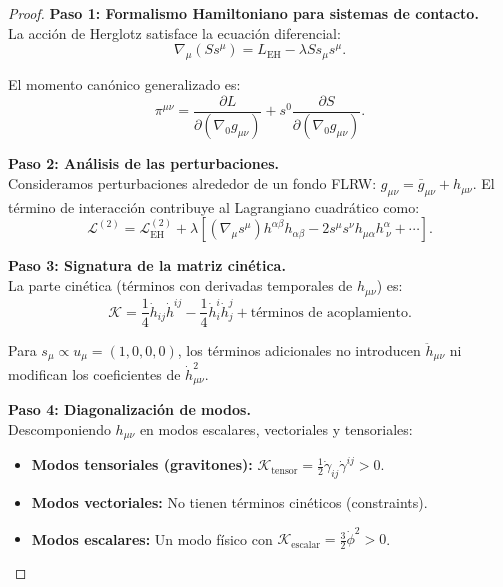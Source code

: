 \documentclass[11pt, a4paper]{article}
\theoremstyle{plain}
\theoremstyle{definition}
\begin{document}
\begin{proof}
\textbf{Paso 1: Formalismo Hamiltoniano para sistemas de contacto.} \\
La acción de Herglotz satisface la ecuación diferencial:
\begin{equation}
\nabla_\mu(S s^\mu) = L_{\text{EH}} - \lambda S s_\mu s^\mu.
\end{equation}

El momento canónico generalizado es:
\begin{equation}
\pi^{\mu\nu} = \frac{\partial L}{\partial (\nabla_0 g_{\mu\nu})} + s^0 \frac{\partial S}{\partial (\nabla_0 g_{\mu\nu})}.
\end{equation}

\textbf{Paso 2: Análisis de las perturbaciones.} \\
Consideramos perturbaciones alrededor de un fondo FLRW: $g_{\mu\nu} = \bar{g}_{\mu\nu} + h_{\mu\nu}$. El término de interacción contribuye al Lagrangiano cuadrático como:
\begin{equation}
\mathcal{L}^{(2)} = \mathcal{L}_{\text{EH}}^{(2)} + \lambda \left[(\nabla_\mu s^\mu) h^{\alpha\beta}h_{\alpha\beta} - 2 s^\mu s^\nu h_{\mu\alpha}h^\alpha_{\ \nu} + \cdots\right].
\end{equation}

\textbf{Paso 3: Signatura de la matriz cinética.} \\
La parte cinética (términos con derivadas temporales de $h_{\mu\nu}$) es:
\begin{equation}
\mathcal{K} = \frac{1}{4} \dot{h}_{ij}\dot{h}^{ij} - \frac{1}{4} \dot{h}^i_i \dot{h}^j_j + \text{términos de acoplamiento}.
\end{equation}

Para $s_\mu \propto u_\mu = (1,0,0,0)$, los términos adicionales no introducen $\ddot{h}_{\mu\nu}$ ni modifican los coeficientes de $\dot{h}_{\mu\nu}^2$.

\textbf{Paso 4: Diagonalización de modos.} \\
Descomponiendo $h_{\mu\nu}$ en modos escalares, vectoriales y tensoriales:
\begin{itemize}
    \item \textbf{Modos tensoriales (gravitones):} $\mathcal{K}_{\text{tensor}} = \frac{1}{2} \dot{\gamma}_{ij}\dot{\gamma}^{ij} > 0$.
    \item \textbf{Modos vectoriales:} No tienen términos cinéticos (constraints).
    \item \textbf{Modos escalares:} Un modo físico con $\mathcal{K}_{\text{escalar}} = \frac{3}{2} \dot{\phi}^2 > 0$.
\end{itemize}


\end{proof}
\end{document}
